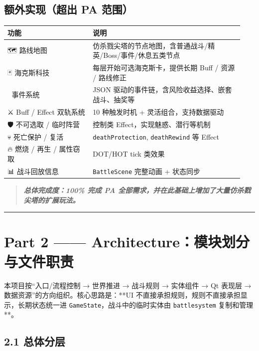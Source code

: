 \documentclass[UTF8,10pt]{ctexart}
\begin{document}
\subsection*{额外实现（超出 PA 范围）}

{\small
\begin{longtable}{p{0.34\linewidth}p{0.60\linewidth}}
\toprule
\textbf{功能} & \textbf{说明} \\
\midrule
{\symbolfont 🗺}{\symbolfont ️} 路线地图 & 仿杀戮尖塔的节点地图，含普通战斗/精英/Boss/事件/休息五类节点 \\
{\symbolfont 🃏} 海克斯科技 & 每层开始可选海克斯卡，提供长期 Buff / 资源 / 路线修正 \\
{\symbolfont 📜} 事件系统 & JSON 驱动的事件链，含风险收益选择、嵌套战斗、抽奖等 \\
{\symbolfont ⚔}{\symbolfont ️} Buff / Effect 双轨系统 & 10 种触发时机 + 灵活组合，支持数据驱动 \\
{\symbolfont 🛡}{\symbolfont ️} 不可选取 / 临时阵营 & 控制类 Effect，实现魅惑、潜行等机制 \\
{\symbolfont 💀} 死亡保护 / 复活 & \texttt{deathProtection}, \texttt{deathRewind} 等 Effect \\
{\symbolfont 🔥} 燃烧 / 再生 / 属性窃取 & DOT/HOT tick 类效果 \\
{\symbolfont 📊} 战斗回放信息 & \texttt{BattleScene} 完整动画 + 状态同步 \\
\bottomrule
\end{longtable}
}

\begin{quote}\itshape \textbf{总体完成度：100\% 完成 PA 全部需求，并在此基础上增加了大量仿杀戮尖塔的扩展玩法。}\end{quote}

\par\medskip\hrule\medskip

\section*{Part 2 —— Architecture：模块划分与文件职责}

本项目按“入口/流程控制 → 世界推进 → 战斗规则 → 实体组件 → Qt 表现层 → 数据资源”的方向组织。核心思路是：**UI 不直接承担规则，规则不直接承担显示，长期状态统一进 \texttt{GameState}，战斗中的临时实体由 \texttt{battlesystem} 复制和管理**。

\subsection*{2.1 总体分层}
\end{document}
